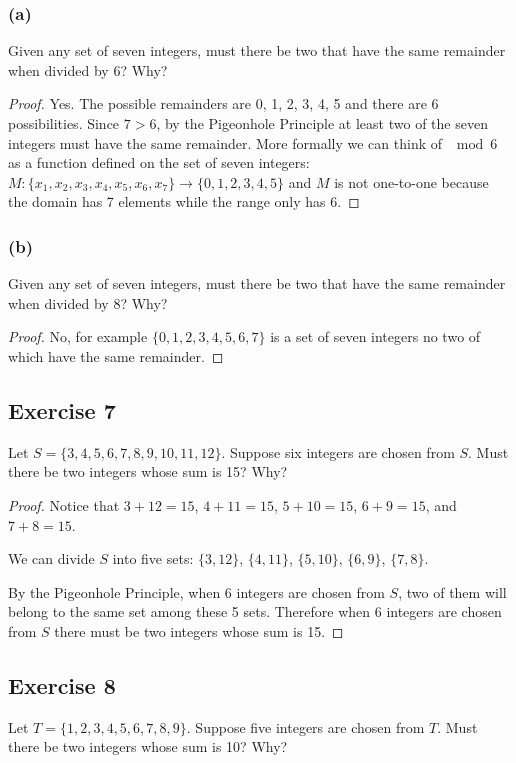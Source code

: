 \documentclass[14pt]{extarticle}
\begin{document}
\subsubsection{(a)}
Given any set of seven integers, must there be two that have the same remainder when divided by 6? Why?

\begin{proof}
Yes. The possible remainders are 0, 1, 2, 3, 4, 5 and there are 6 possibilities. Since \(7 > 6\), by the Pigeonhole 
Principle at least two of the seven integers must have the same remainder. More formally we can think of \(\mod 6\) as 
a function defined on the set of seven integers: \(M: \{x_1 ,x_2,x_3,x_4 , x_5 , x_6 , x_7\} \to \{0, 1, 2, 3, 4, 5\}\) 
and \(M\) is not one-to-one because the domain has 7 elements while the range only has 6.
\end{proof}

\subsubsection{(b)}
Given any set of seven integers, must there be two that have the same remainder when divided by 8? Why?

\begin{proof}
No, for example \(\{0, 1, 2, 3, 4, 5, 6, 7\}\) is a set of seven integers no two of which have the same remainder.
\end{proof}

\subsection{Exercise 7}
Let \(S = \{3, 4, 5, 6, 7, 8, 9, 10, 11, 12\}\). Suppose six integers are chosen from \(S\). Must there be two 
integers whose sum is 15? Why?

\begin{proof}
Notice that \(3 + 12 = 15\), \(4 + 11 = 15\), \(5 + 10 = 15\), \(6 + 9 = 15\), and \(7 + 8 = 15\). 

We can divide \(S\) into five sets: \(\{3, 12\}\), \(\{4, 11\}\), \(\{5, 10\}\), \(\{6, 9\}\), \(\{7, 8\}\). 

By the Pigeonhole Principle, when 6 integers are chosen from \(S\), two of them will belong to the same set among 
these 5 sets. Therefore when 6 integers are chosen from \(S\) there must be two integers whose sum is 15.
\end{proof}

\subsection{Exercise 8}
Let \(T = \{1, 2, 3, 4, 5, 6, 7, 8, 9\}\). Suppose five integers are chosen from \(T\). Must there be two integers 
whose sum is 10? Why?
\end{document}
